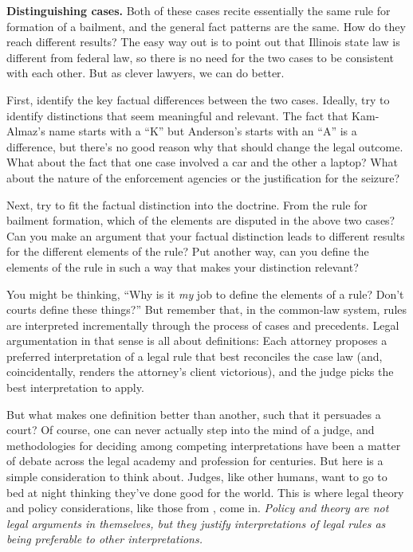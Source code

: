 
\item \textbf{Distinguishing cases.} Both of these cases recite essentially the
same rule for formation of a bailment, and the general fact patterns are the
same. How do they reach different results? The easy way out is to point out that
Illinois state law is different from federal law, so there is no need for the
two cases to be consistent with each other. But as clever lawyers, we can do
better.

First, identify the key factual differences between the two cases. Ideally, try
to identify distinctions that seem meaningful and relevant. The fact that
Kam-Almaz's name starts with a ``K'' but Anderson's starts with an ``A'' is a
difference, but there's no good reason why that should change the legal outcome.
What about the fact that one case involved a car and the other a laptop? What
about the nature of the enforcement agencies or the justification for the
seizure?

Next, try to fit the factual distinction into the doctrine. From the rule for
bailment formation, which of the elements are disputed in the above two cases?
Can you make an argument that your factual distinction leads to different
results for the different elements of the rule? Put another way, can you define
the elements of the rule in such a way that makes your distinction relevant?

You might be thinking, ``Why is it \emph{my} job to define the elements of a
rule? Don't courts define these things?'' But remember that, in the common-law
system, rules are interpreted incrementally through the process of cases and
precedents. Legal argumentation in that sense is all about definitions:
Each attorney proposes a preferred interpretation of a legal rule that best
reconciles the case law (and, coincidentally, renders the attorney's client
victorious), and the judge picks the best interpretation to apply.

But what makes one definition better than another, such that it persuades a
court? Of course, one can never actually step into the mind of a judge, and
methodologies for deciding among competing interpretations have been a matter of
debate across the legal academy and profession for centuries. But here is a
simple consideration to think about. Judges, like other humans, want to go to
bed at night thinking they've done good for the world. This is where legal
theory and policy considerations, like those from
, come in. \emph{Policy and theory are not legal
arguments in themselves, but they justify interpretations of legal rules as
being preferable to other interpretations.}

